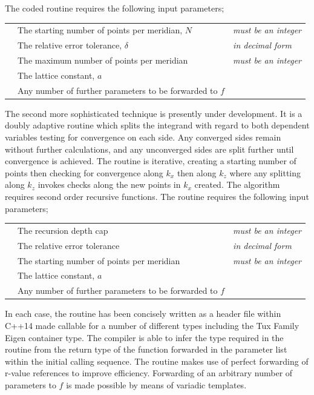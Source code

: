 \documentclass[a4paper, 12pt]{article}
\begin{document}
The coded routine requires the following input parameters;
\\
\begin{listliketab}
	\begin{tabular}{lll}
	\textbullet &The starting number of points per meridian, $N$ &{\it must be an integer}\\
	\textbullet &The relative error tolerance, $\delta$ &{\it in decimal form}\\
	\textbullet &The maximum number of points per meridian &{\it must be an integer}\\
	\textbullet &The lattice constant, $a$ & \\
	\textbullet &Any number of further parameters to be forwarded to $f$&\\
	\end{tabular}
\end{listliketab}
\par
The second more sophisticated technique is presently under development. It is a doubly adaptive routine which splits the integrand with regard to both dependent variables testing for convergence on each side. Any converged sides remain without further calculations, and any unconverged sides are split further until convergence is achieved. The routine is iterative, creating a starting number of points then checking for convergence along $k_x$ then along $k_z$ where any splitting along $k_z$ invokes checks along the new points in $k_x$ created. The algorithm requires second order recursive functions.
The routine requires the following input parameters;

\begin{listliketab}
	\begin{tabular}{lll}
	\textbullet &The recursion depth cap &{\it must be an integer}\\
	\textbullet &The relative error tolerance &{\it in decimal form}\\
	\textbullet &The starting number of points per meridian &{\it must be an integer}\\
	\textbullet &The lattice constant, $a$ & \\
	\textbullet &Any number of further parameters to be forwarded to $f$&\\
	\end{tabular}
\end{listliketab}

In each case, the routine has been concisely written as a header file within C++14 made callable for a number of different types including the Tux Family Eigen container type. The compiler is able to infer the type required in the routine from the return type of the function forwarded in the parameter list within the initial calling sequence. The routine makes use of perfect forwarding of r-value references to improve efficiency.
Forwarding of an arbitrary number of parameters to $f$ is made possible by means of variadic templates.
\end{document}
